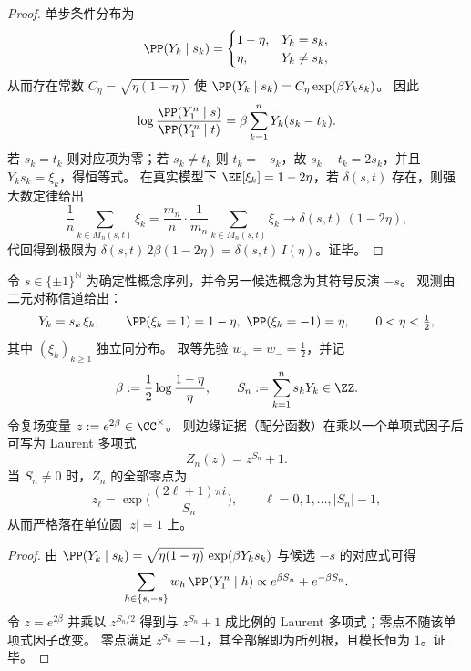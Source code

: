 \begin{proof}
单步条件分布为
\[
\PP(Y_k\mid s_k)=
\begin{cases}
1-\eta,&Y_k=s_k,\\
\eta,&Y_k\neq s_k,
\end{cases}
\]
从而存在常数 \(C_\eta=\sqrt{\eta(1-\eta)}\) 使
\(
\PP(Y_k\mid s_k)=C_\eta\exp(\beta Y_k s_k)
\)。
因此
\[
\log\frac{\PP(Y_1^n\mid s)}{\PP(Y_1^n\mid t)}
=\beta\sum_{k=1}^n Y_k(s_k-t_k).
\]
若 \(s_k=t_k\) 则对应项为零；若 \(s_k\neq t_k\) 则 \(t_k=-s_k\)，故 \(s_k-t_k=2s_k\)，并且 \(Y_k s_k=\xi_k\)，得恒等式。
在真实模型下 \(\EE[\xi_k]=1-2\eta\)，若 \(\delta(s,t)\) 存在，则强大数定律给出
\[
\frac1n\sum_{k\in M_n(s,t)}\xi_k
=\frac{m_n}{n}\cdot\frac1{m_n}\sum_{k\in M_n(s,t)}\xi_k
\to
\delta(s,t)\,(1-2\eta),
\]
代回得到极限为 \(\delta(s,t)\,2\beta(1-2\eta)=\delta(s,t)\,I(\eta)\)。证毕。
\end{proof}

\begin{proposition}\label{prop:xi-leyang-two-hypothesis-unit-circle}
令 \(s\in\{\pm1\}^{\mathbb N}\) 为确定性概念序列，并令另一候选概念为其符号反演 \(-s\)。
观测由二元对称信道给出：
\[
Y_k=s_k\,\xi_k,\qquad \PP(\xi_k=1)=1-\eta,\ \PP(\xi_k=-1)=\eta,\qquad 0<\eta<\tfrac12,
\]
其中 \((\xi_k)_{k\ge 1}\) 独立同分布。
取等先验 \(w_+=w_-=\tfrac12\)，并记
\[
\beta:=\frac12\log\frac{1-\eta}{\eta},
\qquad
S_n:=\sum_{k=1}^n s_kY_k\in\ZZ.
\]
令复场变量 \(z:=e^{2\beta}\in\CC^\times\)。
则边缘证据（配分函数）在乘以一个单项式因子后可写为 Laurent 多项式
\[
Z_n(z)=z^{S_n}+1.
\]
当 \(S_n\neq 0\) 时，\(Z_n\) 的全部零点为
\[
z_\ell=\exp\!\Big(\frac{(2\ell+1)\pi i}{S_n}\Big),\qquad \ell=0,1,\dots,|S_n|-1,
\]
从而严格落在单位圆 \(|z|=1\) 上。
\end{proposition}
\begin{proof}
由
\(
\PP(Y_k\mid s_k)=\sqrt{\eta(1-\eta)}\,\exp(\beta Y_ks_k)
\)
与候选 \(-s\) 的对应式可得
\[
\sum_{h\in\{s,-s\}}w_h\,\PP(Y_1^n\mid h)
\propto
e^{\beta S_n}+e^{-\beta S_n}.
\]
令 \(z=e^{2\beta}\) 并乘以 \(z^{S_n/2}\) 得到与 \(z^{S_n}+1\) 成比例的 Laurent 多项式；零点不随该单项式因子改变。
零点满足 \(z^{S_n}=-1\)，其全部解即为所列根，且模长恒为 \(1\)。证毕。
\end{proof}

